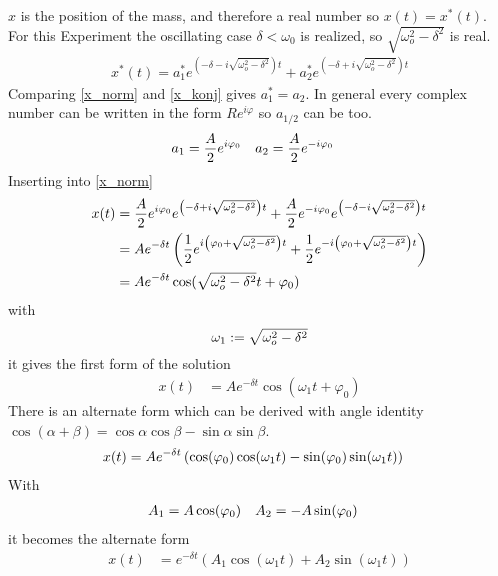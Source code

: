 \(x\) is the position of the mass, and therefore a real number so \(x(t)=x^*(t)\). For this Experiment the oscillating case \(\delta < \omega_0\) is realized, so \(\sqrt{\omega_o^2-\delta^2}\) is real.
\begin{align}
x^*(t) = a_1^*e^{\left(-\delta-i\sqrt{\omega_o^2-\delta^2} \right)t} + a_2^*e^{\left(-\delta+i\sqrt{\omega_o^2-\delta^2} \right)t}
\label{x_konj}
\end{align}
Comparing \eqref{x_norm} and \eqref{x_konj} gives \(a_1^* = a_2\). In general every complex number can be written in the form \(Re^{i\varphi}\) so \(a_{1/2}\) can be too.
\begin{align}
a_1 &= \frac{A}{2} e^{i\varphi_0} && a_2 = \frac{A}{2} e^{-i\varphi_0} \notag
\end{align}
Inserting into \eqref{x_norm}
\begin{align}
x(t) &= \frac{A}{2} e^{i\varphi_0}e^{\left(-\delta+i\sqrt{\omega_o^2-\delta^2} \right)t} + \frac{A}{2} e^{-i\varphi_0}e^{\left(-\delta-i\sqrt{\omega_o^2-\delta^2} \right)t}\notag\\
 &= Ae^{-\delta t} \left(\frac{1}{2} e^{i\left(\varphi_0+\sqrt{\omega_o^2-\delta^2}\right)t} + \frac{1}{2} e^{-i\left(\varphi_0+\sqrt{\omega_o^2-\delta^2}\right)t} \right)\notag\\
  &= Ae^{-\delta t}\cos(\sqrt{\omega_o^2-\delta^2}t + \varphi_0)\notag
\end{align}
with
\begin{equation}
\omega_1 := \sqrt{\omega_o^2-\delta^2}
\notag
\end{equation}
it gives the first form of the solution
\begin{align}
x(t) &= Ae^{-\delta t}\cos(\omega_1 t + \varphi_0)\label{x(t)_1}
\end{align}
There is an alternate form which can be derived with angle identity \(\cos(\alpha + \beta) = \cos \alpha \cos \beta - \sin \alpha \sin \beta \).
\begin{align}
x(t) &= Ae^{-\delta t}\left( \cos(\varphi_0)\cos(\omega_1 t) - \sin(\varphi_0)\sin(\omega_1 t) \right) \notag
\end{align}
With
\begin{align}
A_1 &= A\cos(\varphi_0) && A_2 = -A\sin(\varphi_0) \notag
\end{align}
it becomes the alternate form
\begin{align}
x(t) &= e^{-\delta t}\left(A_1 \cos(\omega_1 t) + A_2 \sin(\omega_1 t) \right) \label{x(t)_2}
\end{align}

